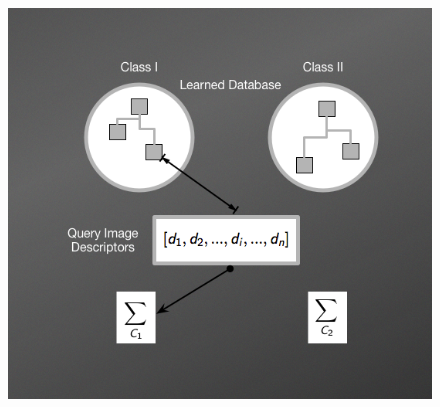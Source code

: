 \begin{figure}[h!]
{\includegraphics[scale=0.25]{images/NBNNMethod3.png}}
\subfigure[ ]

\end{figure}
